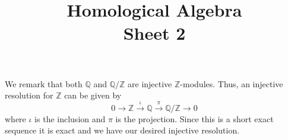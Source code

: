 \documentclass[a4paper]{article}
\title{Homological Algebra \\ Sheet 2}
\begin{document}
\maketitle
\begin{exercise}{2}
  We remark that both $ \mathbb{Q} $ and $ \mathbb{Q}/\mathbb{Z} $ are injective $ \mathbb{Z} $-modules. Thus, an injective resolution for $ \mathbb{Z} $ can be given by
  \begin{equation*}
    0 \to \mathbb{Z} \xrightarrow{\iota} \mathbb{Q} \xrightarrow{\pi} \mathbb{Q}/\mathbb{Z} \to 0
  \end{equation*}
  where $ \iota $ is the inclusion and $ \pi $ is the projection. Since this is a short exact sequence it is exact and we have our desired injective resolution.
\end{exercise}
\end{document}
